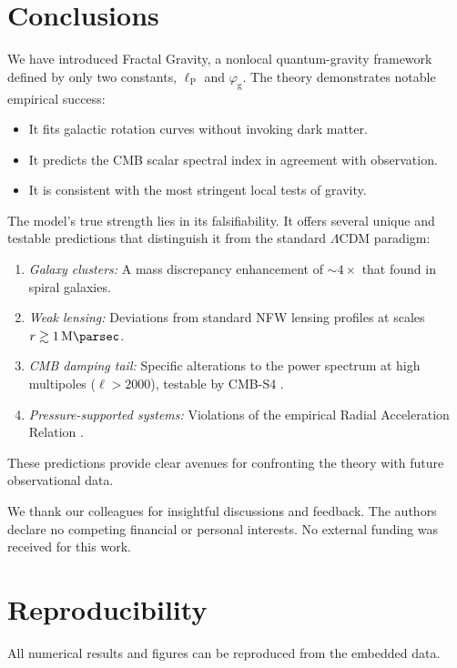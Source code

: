 \documentclass[
  10pt,prd,aps,twocolumn,superscriptaddress,
  nofootinbib,floatfix,tightenlines
]{revtex4-2}
\newcommand{\ellP}{\ell_{\mathrm{P}}}
\newcommand{\phig}{\varphi_{\mathrm{g}}} %
\begin{document}
\section{Conclusions}
\label{sec:concl}
We have introduced Fractal Gravity, a nonlocal quantum-gravity framework defined by only two constants, \(\ellP\) and \(\phig\). The theory demonstrates notable empirical success:
\begin{itemize}[leftmargin=*, nosep]
    \item It fits galactic rotation curves without invoking dark matter.
    \item It predicts the CMB scalar spectral index in agreement with observation.
    \item It is consistent with the most stringent local tests of gravity.
\end{itemize}
The model's true strength lies in its falsifiability. It offers several unique and testable predictions that distinguish it from the standard \(\Lambda\)CDM paradigm:
\begin{enumerate}[leftmargin=*, nosep]
    \item \emph{Galaxy clusters:} A mass discrepancy enhancement of \(\sim4\times\) that found in spiral galaxies.
    \item \emph{Weak lensing:} Deviations from standard NFW lensing profiles at scales \(r \gtrsim \SI{1}{\mega\parsec}\).
    \item \emph{CMB damping tail:} Specific alterations to the power spectrum at high multipoles (\(\ell>2000\)), testable by CMB-S4 \cite{CMB-S4:2019}.
    \item \emph{Pressure-supported systems:} Violations of the empirical Radial Acceleration Relation \cite{McGaugh:2016}.
\end{enumerate}
These predictions provide clear avenues for confronting the theory with future observational data.

\begin{acknowledgments}
We thank our colleagues for insightful discussions and feedback. The authors declare no competing financial or personal interests. No external funding was received for this work.
\end{acknowledgments}

\appendix
\section{Reproducibility}
\label{app:repro}
All numerical results and figures can be reproduced from the embedded data.
\end{document}
